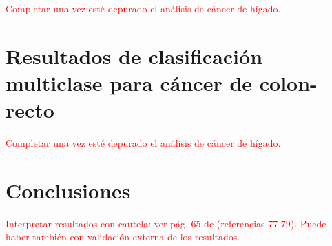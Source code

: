 \textcolor{red}{Completar una vez esté depurado el análisis de cáncer de hígado.}

\section{Resultados de clasificación multiclase para cáncer de colon-recto}

\textcolor{red}{Completar una vez esté depurado el análisis de cáncer de hígado.}

\section{Conclusiones}

\textcolor{red}{Interpretar resultados con cautela: ver pág. 65 de \cite{CastilloSecilla2020} (referencias 77-79). Puede haber también con validación externa de los resultados.}\\

